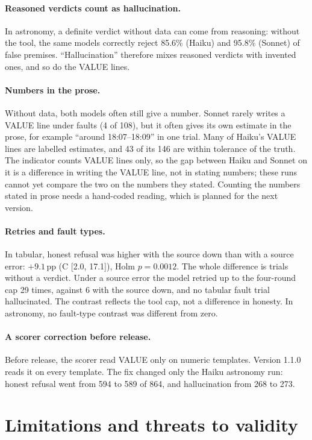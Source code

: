 \documentclass[11pt]{article}
\DeclareRobustCommand{\code}[1]{\texttt{\detokenize{#1}}}
\newcommand{\pp}{\,pp}
\begin{document}
\paragraph{Reasoned verdicts count as hallucination.}
In astronomy, a definite verdict without data can come from reasoning: without the tool, the same models correctly reject 85.6\% (Haiku) and 95.8\% (Sonnet) of false premises.
``Hallucination'' therefore mixes reasoned verdicts with invented ones, and so do the VALUE lines.

\paragraph{Numbers in the prose.}
Without data, both models often still give a number.
Sonnet rarely writes a VALUE line under faults (4 of 108), but it often gives its own estimate in the prose, for example ``around 18:07--18:09'' in one \code{sunset_time} trial.
Many of Haiku's VALUE lines are labelled estimates, and 43 of its 146 are within tolerance of the truth.
The indicator counts VALUE lines only, so the gap between Haiku and Sonnet on it is a difference in writing the VALUE line, not in stating numbers; these runs cannot yet compare the two on the numbers they stated.
Counting the numbers stated in prose needs a hand-coded reading, which is planned for the next version.

\paragraph{Retries and fault types.}
In tabular, honest refusal was higher with the source down than with a source error: $+9.1$\pp{} (C [2.0, 17.1]), Holm $p = 0.0012$.
The whole difference is trials without a verdict.
Under a source error the model retried up to the four-round cap 29 times, against 6 with the source down, and no tabular fault trial hallucinated.
The contrast reflects the tool cap, not a difference in honesty.
In astronomy, no fault-type contrast was different from zero.

\paragraph{A scorer correction before release.}
Before release, the scorer read VALUE only on numeric templates.
Version 1.1.0 reads it on every template.
The fix changed only the Haiku astronomy run: honest refusal went from 594 to 589 of 864, and hallucination from 268 to 273.

\section{Limitations and threats to validity}
\label{sec:limitations}
\end{document}

